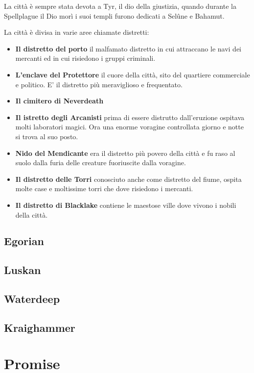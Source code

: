 \documentclass[letterpaper,twocolumn,openany,nodeprecatedcode]{dndbook}
\begin{document}
La città è sempre stata devota a Tyr, il dio della giustizia, quando durante la Spellplague il Dio morì i suoi templi furono dedicati a Selûne e Bahamut.

La città è divisa in varie aree chiamate distretti: 
\begin{itemize}
    \item \textbf{Il distretto del porto} il malfamato distretto in cui attraccano le navi dei mercanti ed in cui risiedono i gruppi criminali.
    \item \textbf{L'enclave del Protettore} il cuore della città, sito del quartiere commerciale e politico. E’ il distretto più meraviglioso e frequentato.
    \item \textbf{Il cimitero di Neverdeath}
    \item \textbf{Il istretto degli Arcanisti} prima di essere distrutto dall'eruzione ospitava molti laboratori magici. Ora una enorme voragine controllata giorno e notte si trova al suo posto.
    \item \textbf{Nido del Mendicante} era il distretto più povero della città e fu raso al suolo dalla furia delle creature fuoriuscite dalla voragine.
    \item \textbf{Il distretto delle Torri} conosciuto anche come distretto del fiume, ospita molte case e moltissime torri che dove risiedono i mercanti.
    \item \textbf{Il distretto di Blacklake} contiene le maestose ville dove vivono i nobili della città.

\end{itemize}

\section{Egorian}
\section{Luskan}
\section{Waterdeep}
\section{Kraighammer}

\chapter{Promise}
\end{document}
